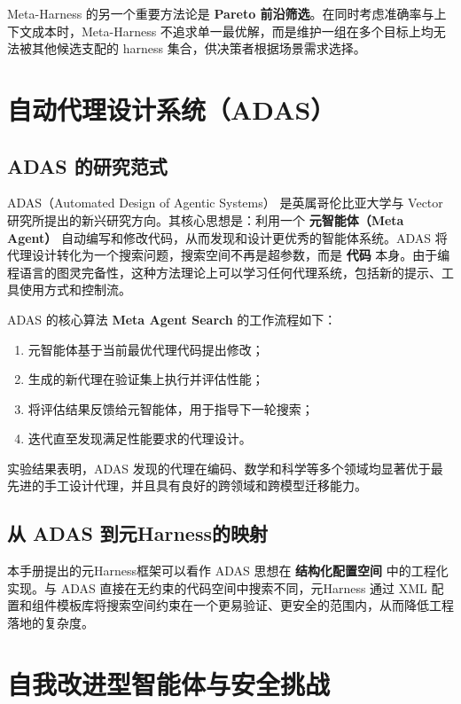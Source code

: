 Meta-Harness 的另一个重要方法论是 \textbf{Pareto 前沿筛选}。在同时考虑准确率与上下文成本时，Meta-Harness 不追求单一最优解，而是维护一组在多个目标上均无法被其他候选支配的 harness 集合，供决策者根据场景需求选择。

\section{自动代理设计系统（ADAS）}

\subsection{ADAS 的研究范式}

ADAS（Automated Design of Agentic Systems）\cite{hu2025adas} 是英属哥伦比亚大学与 Vector 研究所提出的新兴研究方向。其核心思想是：利用一个 \textbf{元智能体（Meta Agent）} 自动编写和修改代码，从而发现和设计更优秀的智能体系统。ADAS 将代理设计转化为一个搜索问题，搜索空间不再是超参数，而是 \textbf{代码} 本身。由于编程语言的图灵完备性，这种方法理论上可以学习任何代理系统，包括新的提示、工具使用方式和控制流。

ADAS 的核心算法 \textbf{Meta Agent Search} 的工作流程如下：
\begin{enumerate}
    \item 元智能体基于当前最优代理代码提出修改；
    \item 生成的新代理在验证集上执行并评估性能；
    \item 将评估结果反馈给元智能体，用于指导下一轮搜索；
    \item 迭代直至发现满足性能要求的代理设计。
\end{enumerate}

实验结果表明，ADAS 发现的代理在编码、数学和科学等多个领域均显著优于最先进的手工设计代理，并且具有良好的跨领域和跨模型迁移能力。

\subsection{从 ADAS 到元Harness的映射}

本手册提出的元Harness框架可以看作 ADAS 思想在 \textbf{结构化配置空间} 中的工程化实现。与 ADAS 直接在无约束的代码空间中搜索不同，元Harness 通过 XML 配置和组件模板库将搜索空间约束在一个更易验证、更安全的范围内，从而降低工程落地的复杂度。

\section{自我改进型智能体与安全挑战}

